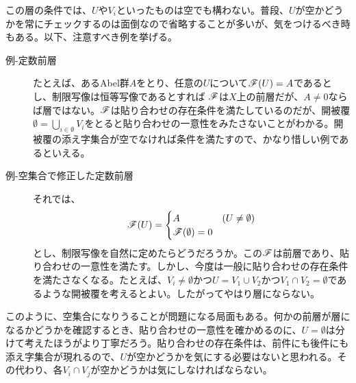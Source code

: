 \begin{rem}
この層の条件では、$U$や$V_i$といったものは空でも構わない。普段、$U$が空かどうかを常にチェックするのは面倒なので省略することが多いが、気をつけるべき時もある。以下、注意すべき例を挙げる。
\begin{description}
  \item[例-定数前層] たとえば、あるAbel群$A$をとり、任意の$U$について$\mathscr{F}(U) = A$であるとし、制限写像は恒等写像であるとすれば
  $\mathscr{F}$は$X$上の前層だが、$A \neq 0$ならば層ではない。$\mathscr{F}$は貼り合わせの存在条件を満たしているのだが、開被覆$\emptyset  = \bigcup_{i \in \emptyset} V_i$をとると貼り合わせの一意性をみたさないことがわかる。開被覆の添え字集合が空でなければ条件を満たすので、かなり惜しい例であるといえる。
  \item[例-空集合で修正した定数前層] それでは、
\[
\mathscr{F}(U) = \begin{cases}
A  &(U \neq \emptyset) \\
\mathscr{F}(\emptyset) = 0
\end{cases}
\]
  とし、制限写像を自然に定めたらどうだろうか。この$\mathscr{F}$は前層であり、貼り合わせの一意性を満たす。しかし、今度は一般に貼り合わせの存在条件を満たさなくなる。たとえば、$V_i \neq \emptyset$かつ$U = V_1 \cup V_2$かつ$V_1 \cap V_2 = \emptyset$であるような開被覆を考えるとよい。したがってやはり層にならない。
\end{description}
このように、空集合になりうることが問題になる局面もある。何かの前層が層になるかどうかを確認するとき、貼り合わせの一意性を確かめるのに、$U = \emptyset$は分けて考えたほうがより丁寧だろう。貼り合わせの存在条件は、前件にも後件にも添え字集合が現れるので、$U$が空かどうかを気にする必要はないと思われる。その代わり、各$V_i \cap V_j $が空かどうかは気にしなければならない。
\end{rem}

\begin{comment}
\begin{rem}
このあと役に立つかどうかはわからないが、次のような言い換えがある。$X$上の$\Ab$-前層$\scrf$が層であるとは、任意の開集合$U \subset X$とその開被覆$U = \bigcup_i U_i$に対して、次の図式
\[
\xymatrix{
0 \ar[r] & \scrf(U) \ar[r]^-{d} & \prod_{i} \scrf(U_i) \ar[r]^-{e} & \prod_{i,j} \scrf(U_{ij})
}
\]
が完全系列であることである。ただし$U_{ij}=U_i \cap U_j$であり、かつ$d$, $e$は
\[
d(s)=(s|_{U_i})_i \quad e((s_i)_i) = (s_i|_{U_{ij}} - s_j|_{U_{ij}})
\]
により定まる準同形である。
\end{rem}
\end{comment}




